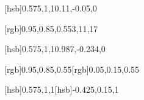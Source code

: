 \documentclass[a4paper,11pt]{article}
\begin{document}
[hsb]{0.575,1,1}{0.11,-0.05,0}





[rgb]{0.95,0.85,0.55}{3,11,17}





[hsb]{0.575,1,1}{0.987,-0.234,0}





[rgb]{0.95,0.85,0.55}[rgb]{0.05,0.15,0.55}





[hsb]{0.575,1,1}[hsb]{-0.425,0.15,1}


























\end{document}

